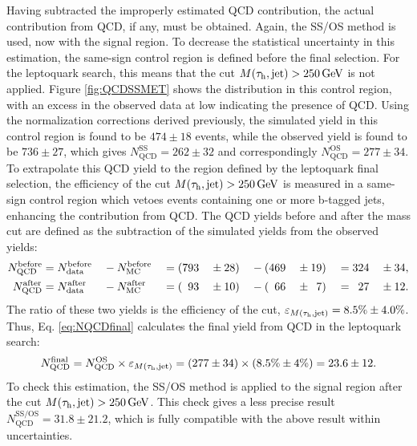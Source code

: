 Having subtracted the improperly estimated QCD contribution, the actual contribution from QCD, if any, must be obtained. Again, the SS/OS method is used, now with the signal region. To decrease the statistical uncertainty in this estimation, the same-sign control region is defined before the final selection. For the leptoquark search, this means that the cut $M(\tau_{\text{h}},\text{jet})>250\,\text{Ge\hspace{-.08em}V}$ is not applied. Figure \ref{fig:QCDSSMET} shows the \met distribution in this control region, with an excess in the observed data at low \met indicating the presence of QCD. Using the normalization corrections derived previously, the simulated yield in this control region is found to be $474\pm18$ events, while the observed yield is found to be $736\pm27$, which gives $N_{\text{QCD}}^{\text{SS}} = 262\pm32$ and correspondingly $N_{\text{QCD}}^{\text{OS}} = 277\pm34$. To extrapolate this QCD yield to the region defined by the leptoquark final selection, the efficiency of the cut $M(\tau_{\text{h}},\text{jet})>250\,\text{Ge\hspace{-.08em}V}$ is measured in a same-sign control region which vetoes events containing one or more b-tagged jets, enhancing the contribution from QCD. The QCD yields before and after the mass cut are defined as the subtraction of the simulated yields from the observed yields:
\begin{alignat}{8}
N_{\text{QCD}}^{\text{before}} &= N_{\text{data}}^{\text{before}} &&- N_{\text{MC}}^{\text{before}} &&= (793 &&\pm 28) &&- (469 &&\pm 19) &&= 324 &&\pm 34, \\
N_{\text{QCD}}^{\text{after}} &= N_{\text{data}}^{\text{after}}   &&- N_{\text{MC}}^{\text{after}}  &&= (\hphantom{7}93  &&\pm 10) &&- (\hphantom{4}66  &&\pm \hphantom{1}7)  &&= \hphantom{3}27  &&\pm 12.
\end{alignat}
The ratio of these two yields is the efficiency of the cut, $\varepsilon_{M(\tau_{\text{h}},\text{jet})}=8.5\%\pm4.0\%$. Thus, Eq. \eqref{eq:NQCDfinal} calculates the final yield from QCD in the leptoquark search:
\begin{equation}
N_{\text{QCD}}^{\text{final}} = N_{\text{QCD}}^{\text{OS}} \times \varepsilon_{M(\tau_{\text{h}},\text{jet})} = (277\pm 34) \times (8.5\% \pm 4\%) = 23.6 \pm 12. \label{eq:NQCDfinal}
\end{equation}
To check this estimation, the SS/OS method is applied to the signal region after the cut $M(\tau_{\text{h}},\text{jet})>250\,\text{Ge\hspace{-.08em}V}$. This check gives a less precise result $N_{\text{QCD}}^{\text{SS/OS}} = 31.8 \pm 21.2$, which is fully compatible with the above result within uncertainties.

